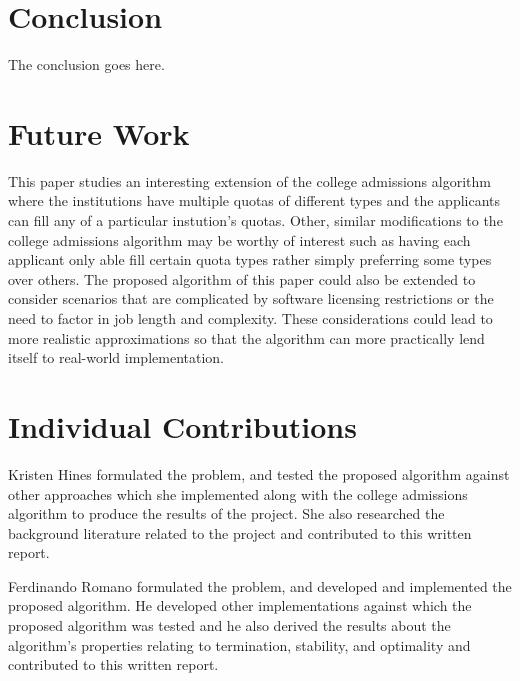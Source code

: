 \documentclass[conference]{IEEEtran}
\begin{document}
\section{Conclusion}
\label{sec:conclusion}
The conclusion goes here.

\section{Future Work}
\label{sec:future}
This paper studies an interesting extension of the college admissions
algorithm where the institutions have multiple quotas of different types
and the applicants can fill any of a particular instution's quotas.
Other, similar modifications to the college admissions algorithm 
may be worthy of interest such as having each applicant only able fill certain 
quota types rather 
simply preferring some types over others.
The proposed algorithm of this paper could also be extended to consider 
scenarios that are complicated by software licensing restrictions
or the need to factor in job length and complexity.
These considerations could lead to more realistic approximations 
so that the algorithm can more practically lend itself to 
real-world implementation.

\section{Individual Contributions}
Kristen Hines formulated the problem, 
and tested the proposed algorithm against other 
approaches which she implemented along with the 
college admissions algorithm to produce the 
results of the project.
She also researched the background literature related to the 
project and contributed to this written report.

Ferdinando Romano formulated the problem,
and developed and implemented the proposed algorithm.
He developed other implementations against which the
proposed algorithm was tested and
he also derived the results about the algorithm's properties 
relating to termination, stability, and optimality
and contributed to this written report.









\end{document}

